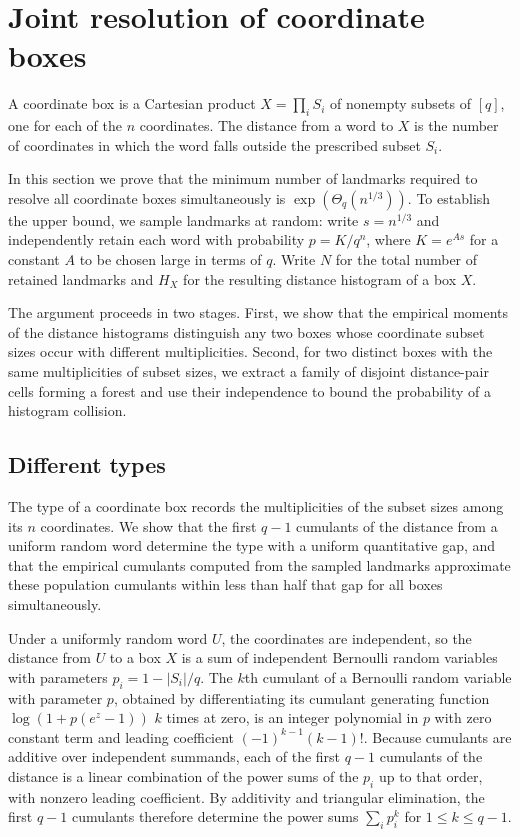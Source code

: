 \section{Joint resolution of coordinate boxes}
A coordinate box is a Cartesian product $X=\prod_i S_i$ of nonempty subsets of $[q]$, one for each of the $n$ coordinates. The distance from a word to $X$ is the number of coordinates in which the word falls outside the prescribed subset $S_i$.

In this section we prove that the minimum number of landmarks required to resolve all coordinate boxes simultaneously is $\exp(\Theta_q(n^{1/3}))$. To establish the upper bound, we sample landmarks at random: write $s=n^{1/3}$ and independently retain each word with probability $p=K/q^n$, where $K=e^{As}$ for a constant $A$ to be chosen large in terms of $q$. Write $N$ for the total number of retained landmarks and $H_X$ for the resulting distance histogram of a box $X$.

The argument proceeds in two stages. First, we show that the empirical moments of the distance histograms distinguish any two boxes whose coordinate subset sizes occur with different multiplicities. Second, for two distinct boxes with the same multiplicities of subset sizes, we extract a family of disjoint distance-pair cells forming a forest and use their independence to bound the probability of a histogram collision.

\subsection{Different types}\label{sec:different-box-types}
The type of a coordinate box records the multiplicities of the subset sizes among its $n$ coordinates. We show that the first $q-1$ cumulants of the distance from a uniform random word determine the type with a uniform quantitative gap, and that the empirical cumulants computed from the sampled landmarks approximate these population cumulants within less than half that gap for all boxes simultaneously.

Under a uniformly random word $U$, the coordinates are independent, so the distance from $U$ to a box $X$ is a sum of independent Bernoulli random variables with parameters $p_i=1-|S_i|/q$. The $k$th cumulant of a Bernoulli random variable with parameter $p$, obtained by differentiating its cumulant generating function $\log(1+p(e^z-1))$ $k$ times at zero, is an integer polynomial in $p$ with zero constant term and leading coefficient $(-1)^{k-1}(k-1)!$. Because cumulants are additive over independent summands, each of the first $q-1$ cumulants of the distance is a linear combination of the power sums of the $p_i$ up to that order, with nonzero leading coefficient. By additivity and triangular elimination, the first $q-1$ cumulants therefore determine the power sums $\sum_i p_i^k$ for $1\le k\le q-1$.

